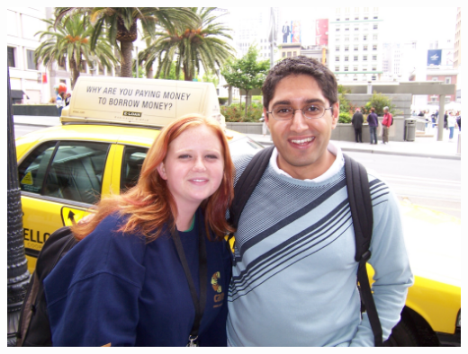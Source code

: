\documentclass[a5paper,titlepage,11pt,draft]{book}
\begin{document}
\begin{center}\includegraphics[width=\textwidth]{gfx/100_1016}\end{center}
\end{document}
